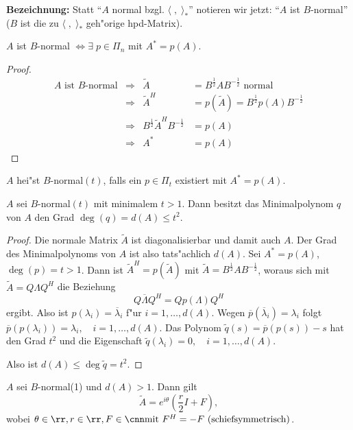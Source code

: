 \textbf{Bezeichnung:} Statt "`$A$ normal bzgl. $\langle \; , \; \rangle_*$"' notieren wir jetzt: "`$A$ ist $B$-normal"' ($B$ ist die zu
$\langle \; , \; \rangle_*$ geh"orige hpd-Matrix).
%
\begin{cor}
 $A$ ist $B$-normal $\Longleftrightarrow \exists \; p \in \Pi_n$ mit $A^*=p(A)$.
\end{cor}
\begin{proof}
 \begin{align*}
 A \text{ ist $B$-normal} & \Longrightarrow    & \tilde{A}    &= B^{\frac{1}{2}}AB^{-\frac{1}{2}} \text{ normal} \\
 & \Longrightarrow        & \tilde{A}^H     &= p(\tilde{A}) = B^{\frac{1}{2}}p(A)B^{-\frac{1}{2}} \\
 & \Longrightarrow        & B^{\frac{1}{2}}\tilde{A}^HB^{-\frac{1}{2}} &=p(A) \\
 & \Longrightarrow        & A^*        & = p(A)
 \end{align*}
\end{proof}
%
\begin{defn}
 $A$ hei"st $B$-normal$(t)$, falls ein $p \in \Pi_t$ existiert mit $A^*=p(A)$.
\end{defn}
%
\begin{sa}
 $A$ sei $B$-normal$(t)$ mit minimalem $t>1$.  Dann besitzt das Minimalpolynom $q$ von $A$ den Grad $\deg{(q)}= d{(A)}\leq t^2.$
\end{sa}
\begin{proof}
Die normale Matrix $\tilde{A}$ ist diagonalisierbar und damit auch $A$. Der Grad des Minimalpolynoms von $A$ ist also tats"achlich $d(A)$.
Sei $A^*=p(A)$, $\deg{(p)} =t > 1$. Dann ist  $\tilde{A}^H=p(\tilde{A})$ mit $\tilde{A}=B^{\frac{1}{2}}AB^{-\frac{1}{2}}$, woraus sich mit
$\tilde{A} = Q\Lambda Q^H$ die Beziehung
\[   Q \overline{\Lambda} Q^H = Q p(\Lambda) Q^H
\]
ergibt. Also ist $p(\lambda_i)=\overline{\lambda}_i$ f"ur $i=1,\dots,d(A)$. Wegen
$\overline{p}(\overline{\lambda}_i)=\lambda_i$ folgt      $\overline{p}(p(\lambda_i))=\lambda_i, \quad i=1,\dots,d(A)$.  Das Polynom
$\tilde{q}(s)=\overline{p}(p(s))-s$ hat den Grad $t^2$      und die Eigenschaft $\tilde{q}(\lambda_i)=0, \quad i=1,\dots,d(A).$  

 Also ist $d(A) \leq \deg{\tilde{q}}=t^2$.\end{proof}
%
\begin{sa}
 $A$ sei $B$-normal(1) und $d(A)>1$. Dann gilt
 \begin{equation}
   \tilde{A}=e^{i\theta}\left( \frac{r}{2}I+F \right), \label{V14-1} 
 \end{equation}
 wobei  $\theta \in \rr, r \in \rr, F \in \cnn \text{mit } F^H=-F \text{ (schiefsymmetrisch)}$.
\end{sa}
